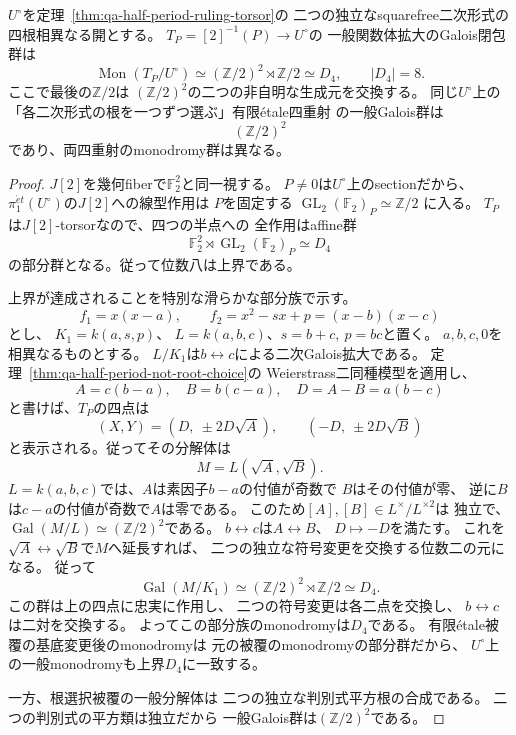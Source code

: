 \begin{theorem}[一般半周期四重射の二面体モノドロミー]
\label{thm:qa-half-period-dihedral-monodromy}
$U^\circ$を定理~\ref{thm:qa-half-period-ruling-torsor}の
二つの独立なsquarefree二次形式の四根相異なる開とする。
$T_P=[2]^{-1}(P)\to U^\circ$の
一般関数体拡大のGalois閉包群は
\begin{equation}
 \operatorname{Mon}(T_P/U^\circ)
 \simeq(\mathbb Z/2)^2\rtimes\mathbb Z/2
 \simeq D_4,\qquad |D_4|=8 .
 \label{eq:qa-half-period-dihedral-monodromy}
\end{equation}
ここで最後の$\mathbb Z/2$は
$(\mathbb Z/2)^2$の二つの非自明な生成元を交換する。
同じ$U^\circ$上の
「各二次形式の根を一つずつ選ぶ」有限\'{e}tale四重射
の一般Galois群は
\[
  (\mathbb Z/2)^2
\]
であり、両四重射のmonodromy群は異なる。
\end{theorem}
\begin{proof}
$J[2]$を幾何fiberで$\mathbb F_2^2$と同一視する。
$P\ne0$は$U^\circ$上のsectionだから、
$\pi_1^{\acute et}(U^\circ)$の$J[2]$への線型作用は
$P$を固定する
$\operatorname{GL}_2(\mathbb F_2)_P\simeq\mathbb Z/2$
に入る。
$T_P$は$J[2]$-torsorなので、四つの半点への
全作用はaffine群
\[
 \mathbb F_2^2\rtimes
 \operatorname{GL}_2(\mathbb F_2)_P\simeq D_4
\]
の部分群となる。従って位数八は上界である。

上界が達成されることを特別な滑らかな部分族で示す。
\[
 f_1=x(x-a),\qquad
 f_2=x^2-sx+p=(x-b)(x-c)
\]
とし、
$K_1=k(a,s,p)$、
$L=k(a,b,c)$、$s=b+c,\ p=bc$と置く。
$a,b,c,0$を相異なるものとする。
$L/K_1$は$b\leftrightarrow c$による二次Galois拡大である。
定理~\ref{thm:qa-half-period-not-root-choice}の
Weierstrass二同種模型を適用し、
\[
 A=c(b-a),\quad B=b(c-a),\quad
 D=A-B=a(b-c)
\]
と書けば、$T_P$の四点は
\[
 (X,Y)=(D,\ \pm2D\sqrt A),
 \qquad (-D,\ \pm2D\sqrt B)
\]
と表示される。従ってその分解体は
\[
 M=L(\sqrt A,\sqrt B).
\]
$L=k(a,b,c)$では、$A$は素因子$b-a$の付値が奇数で
$B$はその付値が零、
逆に$B$は$c-a$の付値が奇数で$A$は零である。
このため$[A],[B]\in L^\times/L^{\times2}$は
独立で、
$\operatorname{Gal}(M/L)\simeq(\mathbb Z/2)^2$である。
$b\leftrightarrow c$は$A\leftrightarrow B$、
$D\mapsto-D$を満たす。
これを
$\sqrt A\leftrightarrow\sqrt B$で$M$へ延長すれば、
二つの独立な符号変更を交換する位数二の元になる。
従って
\[
 \operatorname{Gal}(M/K_1)
 \simeq(\mathbb Z/2)^2\rtimes\mathbb Z/2\simeq D_4 .
\]
この群は上の四点に忠実に作用し、
二つの符号変更は各二点を交換し、
$b\leftrightarrow c$は二対を交換する。
よってこの部分族のmonodromyは$D_4$である。
有限\'{e}tale被覆の基底変更後のmonodromyは
元の被覆のmonodromyの部分群だから、
$U^\circ$上の一般monodromyも上界$D_4$に一致する。

一方、根選択被覆の一般分解体は
二つの独立な判別式平方根の合成である。
二つの判別式の平方類は独立だから
一般Galois群は$(\mathbb Z/2)^2$である。
\end{proof}

